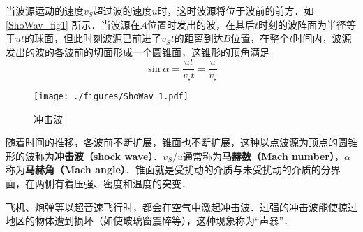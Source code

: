 
当波源运动的速度$v_S$超过波的速度$u $时，这时波源将位于波前的前方．如\autoref{ShoWav_fig1} 所示．当波源在$A $位置时发出的波，在其后$t $时刻的波阵面为半径等于$ut $的球面，但此时刻波源已前进了$v_St$的距离到达$B $位置，在整个$t $时间内，波源发出的波的各波前的切面形成一个圆锥面，这锥形的顶角满足
\begin{equation}
\sin \alpha=\frac{u t}{v_{\mathrm{s}} t}=\frac{u}{v_{\mathrm{s}}}
\end{equation}
\begin{figure}[ht]
\centering
\texttt{[image: ./figures/ShoWav\_1.pdf]}
\caption{冲击波} \label{ShoWav_fig1}
\end{figure}
随着时间的推移，各波前不断扩展，锥面也不断扩展，这种以点波源为顶点的圆锥形的波称为\textbf{冲击波（shock wave）}．$v_S/u$通常称为\textbf{马赫数（Mach number）}，$\alpha$称为\textbf{马赫角（Mach angle）}．锥面就是受扰动的介质与未受扰动的介质的分界面，在两侧有着压强、密度和温度的突变．

飞机、炮弹等以超音速飞行时，都会在空气中激起冲击波．过强的冲击波能使掠过地区的物体遭到损坏（如使玻璃窗震碎等），这种现象称为“声暴”．